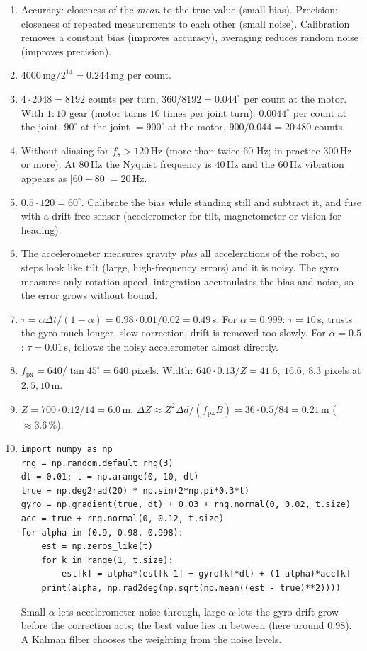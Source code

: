 \begin{enumerate}[label=\textbf{\ansnum.\arabic*}]
  \item Accuracy: closeness of the \emph{mean} to the true value (small bias). Precision: closeness of repeated measurements to each other (small noise). Calibration removes a constant bias (improves accuracy), averaging reduces random noise (improves precision).
  \item $4000$\,mg$/2^{14}=0.244$\,mg per count.
  \item $4\cdot2048=8192$ counts per turn, $360/8192=0.044^\circ$ per count at the motor. With $1\!:\!10$ gear (motor turns $10$ times per joint turn): $0.0044^\circ$ per count at the joint. $90^\circ$ at the joint $=900^\circ$ at the motor, $900/0.044=20\,480$ counts.
  \item Without aliasing for $f_s>120$\,Hz (more than twice $60$ Hz; in practice $300$\,Hz or more). At $80$\,Hz the Nyquist frequency is $40$\,Hz and the $60$\,Hz vibration appears as $|60-80|=20$\,Hz.
  \item $0.5\cdot120=60^\circ$. Calibrate the bias while standing still and subtract it, and fuse with a drift-free sensor (accelerometer for tilt, magnetometer or vision for heading).
  \item The accelerometer measures gravity \emph{plus} all accelerations of the robot, so steps look like tilt (large, high-frequency errors) and it is noisy. The gyro measures only rotation speed, integration accumulates the bias and noise, so the error grows without bound.
  \item $\tau=\alpha\Delta t/(1-\alpha)=0.98\cdot0.01/0.02=0.49$\,s. For $\alpha=0.999$: $\tau=10$\,s, trusts the gyro much longer, slow correction, drift is removed too slowly. For $\alpha=0.5$: $\tau=0.01$\,s, follows the noisy accelerometer almost directly.
  \item $f_\text{px}=640/\tan45^\circ=640$ pixels. Width: $640\cdot0.13/Z=41.6,\ 16.6,\ 8.3$ pixels at $2,5,10$\,m.
  \item $Z=700\cdot0.12/14=6.0$\,m. $\Delta Z\approx Z^2\Delta d/(f_\text{px}B)=36\cdot0.5/84=0.21$\,m ($\approx3.6\,\%$).
  \item[\textbf{\ansnum.10}]
\begin{verbatim}
import numpy as np
rng = np.random.default_rng(3)
dt = 0.01; t = np.arange(0, 10, dt)
true = np.deg2rad(20) * np.sin(2*np.pi*0.3*t)
gyro = np.gradient(true, dt) + 0.03 + rng.normal(0, 0.02, t.size)
acc = true + rng.normal(0, 0.12, t.size)
for alpha in (0.9, 0.98, 0.998):
    est = np.zeros_like(t)
    for k in range(1, t.size):
        est[k] = alpha*(est[k-1] + gyro[k]*dt) + (1-alpha)*acc[k]
    print(alpha, np.rad2deg(np.sqrt(np.mean((est - true)**2))))
\end{verbatim}
  Small $\alpha$ lets accelerometer noise through, large $\alpha$ lets the gyro drift grow before the correction acts; the best value lies in between (here around $0.98$). A Kalman filter chooses the weighting from the noise levels.
\end{enumerate}
